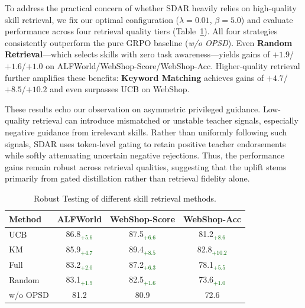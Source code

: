 \documentclass{article} %
\newcommand{\methodname}{\textsc{SDAR}\xspace}
\newcommand{\posval}[1]{{\textcolor{darkgreen}{#1}}}
\begin{document}
To address the practical concern of whether \methodname{} heavily relies on high-quality skill retrieval, we fix our optimal configuration ($\lambda=0.01$, $\beta=5.0$) and evaluate performance across four retrieval quality tiers (Table~\ref{tab:ablation_method}). 
All four strategies consistently outperform the pure GRPO baseline (\emph{w/o OPSD}). 
Even \textbf{Random Retrieval}---which selects skills with zero task awareness---yields gains of $+1.9$/$+1.6$/$+1.0$ on ALFWorld/WebShop-Score/WebShop-Acc. 
Higher-quality retrieval further amplifies these benefits: \textbf{Keyword Matching} achieves gains of $+4.7$/$+8.5$/$+10.2$ and even surpasses UCB on WebShop. 

These results echo our observation on asymmetric privileged guidance. 
Low-quality retrieval can introduce mismatched or unstable teacher signals, especially negative guidance from irrelevant skills. 
Rather than uniformly following such signals, \methodname{} uses token-level gating to retain positive teacher endorsements while softly attenuating uncertain negative rejections. 
Thus, the performance gains remain robust across retrieval qualities, suggesting that the uplift stems primarily from gated distillation rather than retrieval fidelity alone.

\begin{table}[t]       
    \centering
    \caption{Robust Testing of different skill retrieval methods.}                          
    \label{tab:ablation_method}                                                             
    \begin{tabular}{lccc}
    \toprule
        Method & ALFWorld & WebShop-Score & WebShop-Acc \\

        \midrule

        UCB & 86.8\posval{$_{+5.6}$} & 87.5\posval{$_{+6.6}$} & 81.2\posval{$_{+8.6}$} \\   
        KM & 85.9\posval{$_{+4.7}$} & 89.4\posval{$_{+8.5}$} & 82.8\posval{$_{+10.2}$} \\
        Full & 83.2\posval{$_{+2.0}$} & 87.2\posval{$_{+6.3}$} & 78.1\posval{$_{+5.5}$} \\  
        Random & 83.1\posval{$_{+1.9}$} & 82.5\posval{$_{+1.6}$} & 73.6\posval{$_{+1.0}$} \\
        \rowcolor{gray!10} w/o OPSD & 81.2 & 80.9 & 72.6 \\
        \bottomrule
    \end{tabular}
\end{table} 
\end{document}
